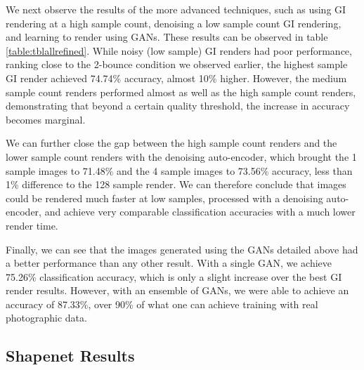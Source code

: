 \documentclass[10pt,twocolumn,letterpaper]{article}
\begin{document}
We next observe the results of the more advanced techniques, such as using GI rendering at a high sample count, denoising a low sample count GI rendering, and learning to render using GANs. These results can be observed in table \ref{table:tblallrefined}. While noisy (low sample) GI renders had poor performance, ranking close to the 2-bounce condition we observed earlier, the highest sample GI render achieved 74.74\% accuracy, almost 10\% higher. However, the medium sample count renders performed almost as well as the high sample count renders, demonstrating that beyond a certain quality threshold, the increase in accuracy becomes marginal. 

We can further close the gap between the high sample count renders and the lower sample count renders with the denoising auto-encoder, which brought the 1 sample images to 71.48\% and the 4 sample images to 73.56\% accuracy, less than 1\% difference to the 128 sample render. We can therefore conclude that images could be rendered much faster at low samples, processed with a denoising auto-encoder, and achieve very comparable classification accuracies with a much lower render time.

Finally, we can see that the images generated using the GANs detailed above had a better performance than any other result. With a single GAN, we achieve 75.26\% classification accuracy, which is only a slight increase over the best GI render results. However, with an ensemble of GANs, we were able to achieve an accuracy of 87.33\%, over 90\% of what one can achieve training with real photographic data.
\subsection{Shapenet Results}
\end{document}
